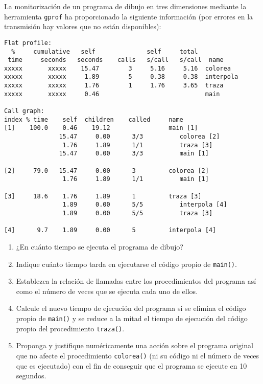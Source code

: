 \begin{ejercicio}
    La monitorización de un programa de dibujo en tres dimensiones mediante la herramienta \verb|gprof| ha proporcionado la siguiente información (por errores en la transmisión hay valores que no están disponibles):
    \begin{verbatim}
Flat profile:
  %     cumulative   self              self     total           
 time     seconds   seconds    calls   s/call   s/call  name    
xxxxx       xxxxx    15.47        3     5.16     5.16  colorea 
xxxxx       xxxxx     1.89        5     0.38     0.38  interpola
xxxxx       xxxxx     1.76        1     1.76     3.65  traza   
xxxxx       xxxxx     0.46                             main

Call graph:
index % time    self  children    called     name
[1]    100.0    0.46    19.12                main [1]
               15.47     0.00      3/3          colorea [2]
                1.76     1.89      1/1          traza [3]
               15.47     0.00      3/3          main [1]

[2]     79.0   15.47     0.00      3         colorea [2]
                1.76     1.89      1/1          main [1]

[3]     18.6    1.76     1.89      1         traza [3]
                1.89     0.00      5/5          interpola [4]
                1.89     0.00      5/5          traza [3]

[4]      9.7    1.89     0.00      5         interpola [4]
    \end{verbatim}
    \begin{enumerate}
        \item ¿En cuánto tiempo se ejecuta el programa de dibujo?
        \item Indique cuánto tiempo tarda en ejecutarse el código propio de \verb|main()|.
        \item Establezca la relación de llamadas entre los procedimientos del programa así como el número de veces que se ejecuta cada uno de ellos.
        \item Calcule el nuevo tiempo de ejecución del programa si se elimina el código propio de \verb|main()| y se reduce a la mitad el tiempo de ejecución del código propio del procedimiento \verb|traza()|.
        \item Proponga y justifique numéricamente una acción sobre el programa original que no afecte el procedimiento \verb|colorea()| (ni su código ni el número de veces que es ejecutado) con el fin de conseguir que el programa se ejecute en 10 segundos.
    \end{enumerate}
\end{ejercicio}
